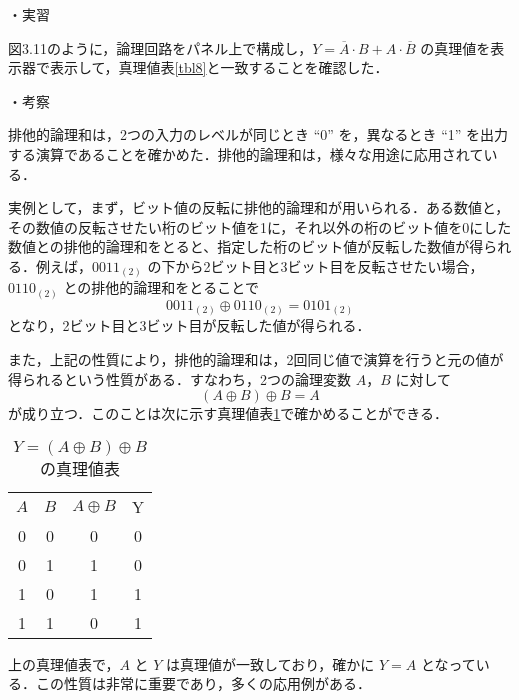 
\renewcommand{\thetable}{\arabic{section}.\arabic{table}}
\renewcommand{\theequation}{\arabic{section}.\arabic{subsection}.\arabic{equation}}


\vspace{7mm}
\noindent
・実習 \vspace{2mm}

図3.11のように，論理回路をパネル上で構成し，$Y = \overline{A} \cdot B + A \cdot \overline{B}$ の真理値を表示器で表示して，真理値表\ref{tbl8}と一致することを確認した．

\vspace{7mm}
\noindent
・考察 \vspace{2mm}

排他的論理和は，2つの入力のレベルが同じとき ``0'' を，異なるとき ``1'' を出力する演算であることを確かめた．排他的論理和は，様々な用途に応用されている．

実例として，まず，ビット値の反転に排他的論理和が用いられる．ある数値と，その数値の反転させたい桁のビット値を1に，それ以外の桁のビット値を0にした数値との排他的論理和をとると、指定した桁のビット値が反転した数値が得られる．例えば，${0011}_{(2)}$ の下から2ビット目と3ビット目を反転させたい場合，${0110}_{(2)}$ との排他的論理和をとることで
$$
    {0011}_{(2)} \oplus {0110}_{(2)} = {0101}_{(2)}
$$
となり，2ビット目と3ビット目が反転した値が得られる．

また，上記の性質により，排他的論理和は，2回同じ値で演算を行うと元の値が得られるという性質がある．すなわち，2つの論理変数 $A$，$B$ に対して
\begin{equation}
    (A \oplus B) \oplus B = A \label{eq01}
\end{equation}
が成り立つ．このことは次に示す真理値表\ref{tbl01}で確かめることができる．

\begin{table}[!h]
    \caption{$Y = (A \oplus B) \oplus B$ の真理値表}
    \label{tbl01}
    \begin{center}
        \begin{tabular}{|c|c||c|c|}
            \hline
            $A$ & $B$ & $A \oplus B$ & Y \\
            \hhline{|=|=#=|=|}
            0   & 0   & 0            & 0 \\
            \hline
            0   & 1   & 1            & 0 \\
            \hline
            1   & 0   & 1            & 1 \\
            \hline
            1   & 1   & 0            & 1 \\
            \hline
        \end{tabular}
    \end{center}
\end{table}
上の真理値表で，$A$ と $Y$ は真理値が一致しており，確かに $Y = A$ となっている．この性質は非常に重要であり，多くの応用例がある．

